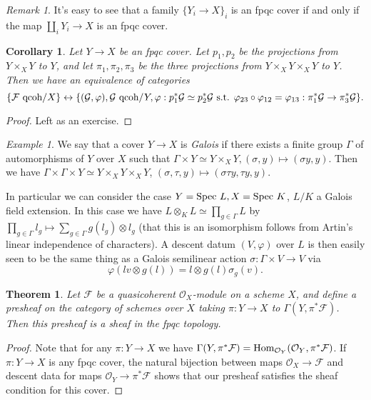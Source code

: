 \documentclass[letterpaper,11pt]{article}
\newtheorem{thm}{Theorem}
\newtheorem{cor}{Corollary}
\theoremstyle{definition}
\theoremstyle{remark}
\newtheorem{ex}{Example}
\newtheorem{rmk}{Remark}
\begin{document}
\begin{rmk} It's easy to see that a family $\{Y_i \rightarrow X\}_i$ is an fpqc cover if and only if the map $\coprod_i Y_i \rightarrow X$ is an fpqc cover.
\end{rmk}

\begin{cor} Let $Y\rightarrow X$ be an fpqc cover. Let $p_1, p_2$ be the projections from $Y\times_X Y$ to $Y$, and let $\pi_1, \pi_2, \pi_3$ be the three projections from $Y\times_XY\times_XY$ to $Y$. Then we have an equivalence of categories
\[
\{\mathcal{F}\mbox{\rm{ qcoh}}/X\}\leftrightarrow\{(\mathcal{G},\varphi), \mathcal{G}\mbox{\rm{ qcoh}}/Y, \varphi:p_1^*\mathcal{G}\simeq p_2^*\mathcal{G} \mbox{ s.t. } \varphi_{23}\circ\varphi_{12} = \varphi_{13}:\pi_1^*\mathcal{G}\rightarrow\pi_3^*\mathcal{G}\}.
\]
\end{cor}
\begin{proof} Left as an exercise.
\end{proof}

\begin{ex} We say that a cover $Y \rightarrow X$ is \emph{Galois} if there exists a finite group $\Gamma$ of automorphisms of $Y$ over $X$ such that $\Gamma\times Y \simeq Y\times_XY, (\sigma,y)\mapsto(\sigma y,y)$. Then we have $\Gamma\times\Gamma\times Y\simeq Y\times_XY\times_XY$, $(\sigma,\tau,y) \mapsto (\sigma\tau y,\tau y,y)$.

In particular we can consider the case $Y = \mbox{\rm Spec }L, X = \mbox{\rm Spec }K$, $L/K$ a Galois field extension. In this case we have $L\otimes_KL \simeq \prod_{g\in\Gamma} L$ by $\prod_{g\in\Gamma} l_g \mapsto \sum_{g\in\Gamma}g(l_g)\otimes l_g$ (that this is an isomorphism follows from Artin's linear independence of characters). A descent datum $(V, \varphi)$ over $L$ is then easily seen to be the same thing as a Galois semilinear action $\sigma:\Gamma\times V\rightarrow V$ via
\[
\varphi(lv\otimes g(l)) = l\otimes g(l)\sigma_g(v).
\]
\end{ex}

\begin{thm} Let $\mathcal{F}$ be a quasicoherent $\mathcal{O}_X$-module on a scheme $X$, and define a presheaf on the category of schemes over $X$ taking $\pi:Y\rightarrow X$ to $\Gamma(Y,\pi^*\mathcal{F})$. Then this presheaf is a sheaf in the fpqc topology.
\end{thm}
\begin{proof} Note that for any $\pi:Y\rightarrow X$ we have $\Gamma(Y,\pi^*\mathcal{F}) = \mbox{\rm Hom}_{\mathcal{O}_Y}(\mathcal{O}_Y,\pi^*\mathcal{F})$. If $\pi: Y\rightarrow X$ is any fpqc cover, the natural bijection between maps $\mathcal{O}_X \rightarrow \mathcal{F}$ and descent data for maps $\mathcal{O}_Y\rightarrow \pi^*\mathcal{F}$ shows that our presheaf satisfies the sheaf condition for this cover.
\end{proof}
\end{document}
